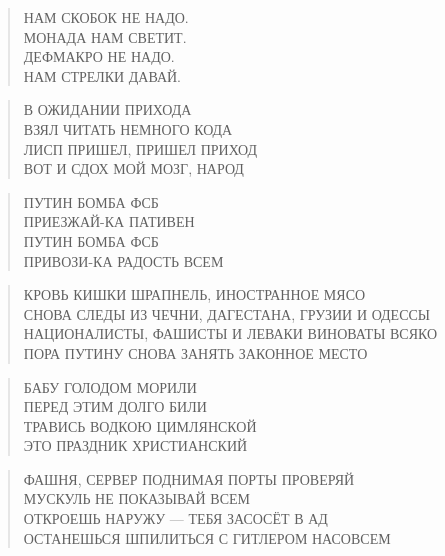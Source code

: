 \poemtitle{***}
\begin{verse}
НАМ СКОБОК НЕ НАДО.\\
МОНАДА НАМ СВЕТИТ.\\
ДЕФМАКРО НЕ НАДО.\\
НАМ СТРЕЛКИ ДАВАЙ.
\end{verse}

\poemtitle{***}
\begin{verse}
В ОЖИДАНИИ ПРИХОДА\\
ВЗЯЛ ЧИТАТЬ НЕМНОГО КОДА\\
ЛИСП ПРИШЕЛ, ПРИШЕЛ ПРИХОД\\
ВОТ И СДОХ МОЙ МОЗГ, НАРОД
\end{verse}

\poemtitle{***}
\begin{verse}
ПУТИН БОМБА ФСБ\\
ПРИЕЗЖАЙ-КА ПАТИВЕН\\
ПУТИН БОМБА ФСБ\\
ПРИВОЗИ-КА РАДОСТЬ ВСЕМ
\end{verse}

\poemtitle{***}
\begin{verse}
КРОВЬ КИШКИ ШРАПНЕЛЬ, ИНОСТРАННОЕ МЯСО \\
СНОВА СЛЕДЫ ИЗ ЧЕЧНИ, ДАГЕСТАНА, ГРУЗИИ И ОДЕССЫ\\
НАЦИОНАЛИСТЫ, ФАШИСТЫ И ЛЕВАКИ ВИНОВАТЫ ВСЯКО\\
ПОРА ПУТИНУ СНОВА ЗАНЯТЬ ЗАКОННОЕ МЕСТО
\end{verse}

\poemtitle{***}
\begin{verse}
БАБУ ГОЛОДОМ МОРИЛИ\\
ПЕРЕД ЭТИМ ДОЛГО БИЛИ\\
ТРАВИСЬ ВОДКОЮ ЦИМЛЯНСКОЙ\\
ЭТО ПРАЗДНИК ХРИСТИАНСКИЙ
\end{verse}

\poemtitle{***}
\begin{verse}
ФАШНЯ, СЕРВЕР ПОДНИМАЯ ПОРТЫ ПРОВЕРЯЙ\\
МУСКУЛЬ НЕ ПОКАЗЫВАЙ ВСЕМ\\
ОТКРОЕШЬ НАРУЖУ — ТЕБЯ ЗАСОСЁТ В АД\\
ОСТАНЕШЬСЯ ШПИЛИТЬСЯ С ГИТЛЕРОМ НАСОВСЕМ
\end{verse}

